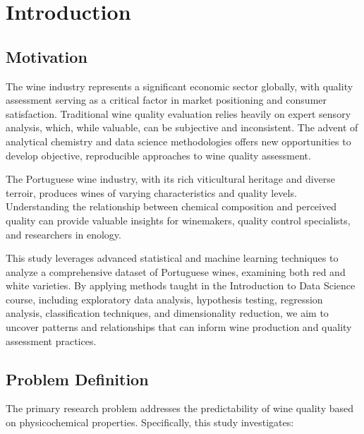\chapter{Introduction}

\section{Motivation}

The wine industry represents a significant economic sector globally, with quality assessment serving as a critical factor in market positioning and consumer satisfaction. Traditional wine quality evaluation relies heavily on expert sensory analysis, which, while valuable, can be subjective and inconsistent. The advent of analytical chemistry and data science methodologies offers new opportunities to develop objective, reproducible approaches to wine quality assessment.

The Portuguese wine industry, with its rich viticultural heritage and diverse terroir, produces wines of varying characteristics and quality levels. Understanding the relationship between chemical composition and perceived quality can provide valuable insights for winemakers, quality control specialists, and researchers in enology.

This study leverages advanced statistical and machine learning techniques to analyze a comprehensive dataset of Portuguese wines, examining both red and white varieties. By applying methods taught in the Introduction to Data Science course, including exploratory data analysis, hypothesis testing, regression analysis, classification techniques, and dimensionality reduction, we aim to uncover patterns and relationships that can inform wine production and quality assessment practices.

\section{Problem Definition}

The primary research problem addresses the predictability of wine quality based on physicochemical properties. Specifically, this study investigates:

